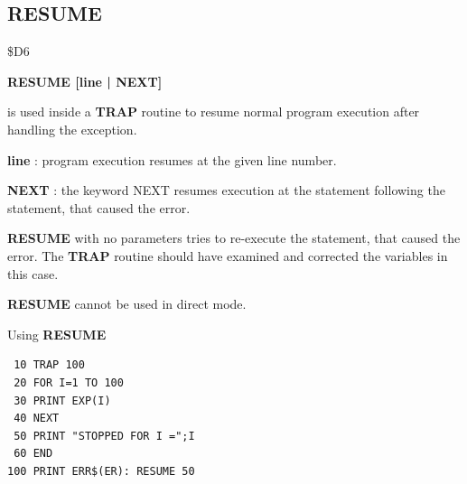 \subsection{RESUME}
\begin{description}[leftmargin=2cm,style=nextline]
\item [Token:] \$D6
\item [Format:] {\bf RESUME [line | NEXT]}
\item [Usage:]  is used inside a {\bf TRAP} routine to
                resume normal program execution after
                handling the exception.

                {\bf line} : program execution resumes
                at the given line number.

                {\bf NEXT} : the keyword NEXT resumes
                execution at the statement following
                the statement, that caused the error.

                {\bf RESUME} with no parameters tries to
                re-execute the statement, that caused the error.
                The {\bf TRAP} routine should have examined
                and corrected the variables in this case.

\item [Remarks:] {\bf RESUME} cannot be used in direct mode.
\item [Example:] Using {\bf RESUME}

\begin{tcolorbox}[colback=black,coltext=white]
\verbatimfont{\codefont}
\begin{verbatim}
 10 TRAP 100
 20 FOR I=1 TO 100
 30 PRINT EXP(I)
 40 NEXT
 50 PRINT "STOPPED FOR I =";I
 60 END
100 PRINT ERR$(ER): RESUME 50
\end{verbatim}
\end{tcolorbox}
\end{description}


\newpage
